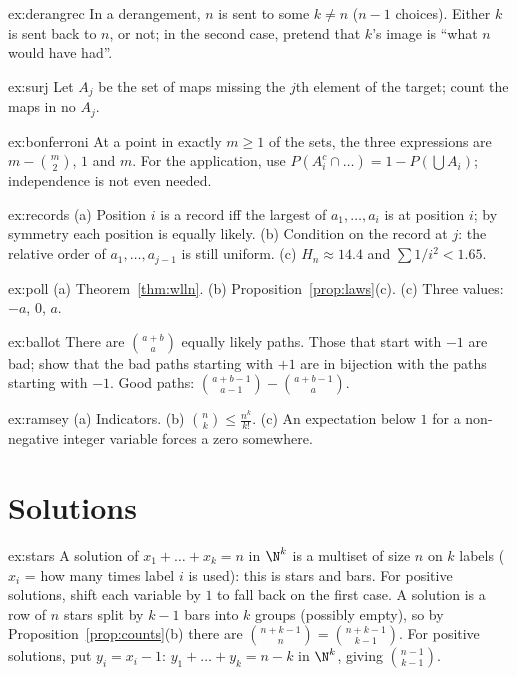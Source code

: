 \begin{hint}{ex:derangrec}
In a derangement, $n$ is sent to some $k\ne n$ ($n-1$ choices). Either $k$ is sent back to $n$, or not; in the second case, pretend that $k$'s image is ``what $n$ would have had''.
\end{hint}
\begin{hint}{ex:surj}
Let $A_j$ be the set of maps missing the $j$th element of the target; count the maps in no $A_j$.
\end{hint}
\begin{hint}{ex:bonferroni}
At a point in exactly $m\ge1$ of the sets, the three expressions are $m-\binom m2$, $1$ and $m$. For the application, use $P(A_i^c\cap\dots)=1-P(\bigcup A_i)$; independence is not even needed.
\end{hint}
\begin{hint}{ex:records}
(a) Position $i$ is a record iff the largest of $a_1,\dots,a_i$ is at position $i$; by symmetry each position is equally likely. (b) Condition on the record at $j$: the relative order of $a_1,\dots,a_{j-1}$ is still uniform. (c) $H_n\approx14.4$ and $\sum1/i^2<1.65$.
\end{hint}
\begin{hint}{ex:poll}
(a) Theorem~\ref{thm:wlln}. (b) Proposition~\ref{prop:laws}(c). (c) Three values: $-a$, $0$, $a$.
\end{hint}
\begin{hint}{ex:ballot}
There are $\binom{a+b}a$ equally likely paths. Those that start with $-1$ are bad; show that the bad paths starting with $+1$ are in bijection with the paths starting with $-1$. Good paths: $\binom{a+b-1}{a-1}-\binom{a+b-1}{a}$.
\end{hint}
\begin{hint}{ex:ramsey}
(a) Indicators. (b) $\binom nk\le\frac{n^k}{k!}$. (c) An expectation below $1$ for a non-negative integer variable forces a zero somewhere.
\end{hint}

\section{Solutions}

\begin{solution}{ex:stars}
\idea A solution of $x_1+\dots+x_k=n$ in $\N^k$ is a multiset of size $n$ on $k$ labels ($x_i$ = how many times label $i$ is used): this is stars and bars. For positive solutions, shift each variable by $1$ to fall back on the first case.
\writeup A solution is a row of $n$ stars split by $k-1$ bars into $k$ groups (possibly empty), so by Proposition~\ref{prop:counts}(b) there are $\binom{n+k-1}{n}=\binom{n+k-1}{k-1}$. For positive solutions, put $y_i=x_i-1$:
$y_1+\dots+y_k=n-k$ in $\N^k$, giving $\binom{n-1}{k-1}$.
\end{solution}

